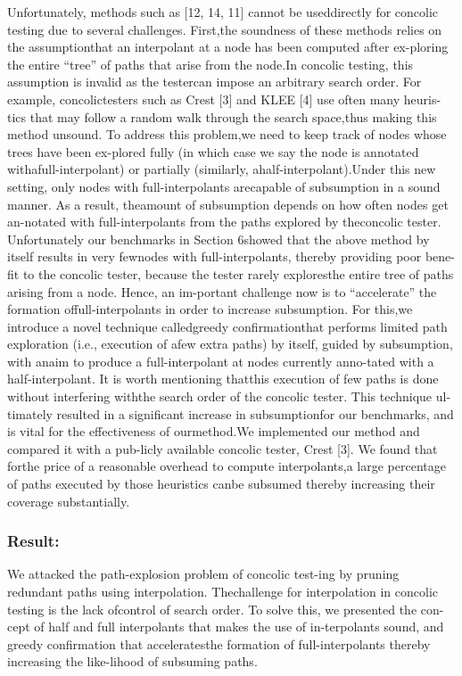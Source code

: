 \documentclass[	runningheads,
				a4paper]{llncs}
\begin{document}
Unfortunately, methods such as [12, 14, 11] cannot be useddirectly for concolic testing due to several challenges.  First,the  soundness  of  these  methods  relies  on  the  assumptionthat an interpolant at a node has been computed after ex-ploring the entire “tree” of paths that arise from the node.In concolic testing, this assumption is invalid as the testercan impose an arbitrary search order.  For example, concolictesters such as Crest [3] and KLEE [4] use often many heuris-tics that may follow a random walk through the search space,thus making this method unsound.  To address this problem,we need to keep track of nodes whose trees have been ex-plored fully (in which case we say the node is annotated withafull-interpolant) or partially (similarly, ahalf-interpolant).Under this new setting, only nodes with full-interpolants arecapable of subsumption in a sound manner.  As a result, theamount of subsumption depends on how often nodes get an-notated with full-interpolants from the paths explored by theconcolic tester.  Unfortunately our benchmarks in Section 6showed that the above method by itself results in very fewnodes  with  full-interpolants,  thereby  providing  poor  bene-fit to the concolic tester, because the tester rarely exploresthe entire tree of paths arising from a node.  Hence, an im-portant  challenge  now  is  to “accelerate” the  formation  offull-interpolants in order to increase subsumption.  For this,we  introduce  a  novel  technique  calledgreedy  confirmationthat performs limited path exploration (i.e., execution of afew extra paths) by itself, guided by subsumption, with anaim to produce a full-interpolant at nodes currently anno-tated with a half-interpolant.  It is worth mentioning thatthis execution of few paths is done without interfering withthe search order of the concolic tester.  This technique ul-timately  resulted  in  a  significant  increase  in  subsumptionfor our benchmarks, and is vital for the effectiveness of ourmethod.We implemented our method and compared it with a pub-licly available concolic tester, Crest [3].  We found that forthe price of a reasonable overhead to compute interpolants,a large percentage of paths executed by those heuristics canbe subsumed thereby increasing their coverage substantially.

\subsubsection{Result:}
We  attacked  the  path-explosion  problem  of  concolic  test-ing  by  pruning  redundant  paths  using  interpolation.   Thechallenge for interpolation in concolic testing is the lack ofcontrol of search order.  To solve this, we presented the con-cept of half and full interpolants that makes the use of in-terpolants sound, and greedy confirmation that acceleratesthe formation of full-interpolants thereby increasing the like-lihood  of  subsuming  paths. 
\end{document}
